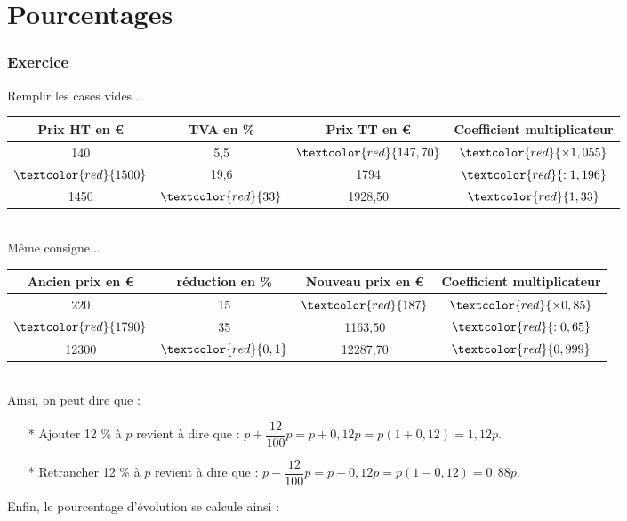 \setcounter{section}{0} 

\part{Pourcentages}

\section{Exercice }

Remplir les cases vides... \\

\begin{tabular}{c|c|c|c} 
Prix HT en € & TVA en \% & Prix TT en € & Coefficient multiplicateur \\
\hline
140 & 5,5 & $\textcolor{red}{147,70}$ & $\textcolor{red}{\times 1,055}$ \\
$\textcolor{red}{1500}$& 19,6 & 1794 & $\textcolor{red}{: 1,196}$ \\
1450 & $\textcolor{red}{33}$ & 1928,50 & $\textcolor{red}{1,33}$ \\
\end{tabular} \\

Même consigne... \\

\begin{tabular}{c|c|c|c} 
Ancien prix en € & réduction en \% & Nouveau prix en € & Coefficient multiplicateur \\
\hline
220 & 15 & $\textcolor{red}{187}$ & $\textcolor{red}{\times 0,85}$ \\
$\textcolor{red}{1790}$& 35 & 1163,50 & $\textcolor{red}{: 0,65}$ \\
12300 & $\textcolor{red}{0,1}$ & 12287,70 & $\textcolor{red}{0,999}$ \\
\end{tabular} \\

Ainsi, on peut dire que : 

\begin{enumerate}
\item[*] Ajouter 12 \% à $p$ revient à dire que : $ p + \dfrac{12}{100}p = p + 0,12p = p \left(1 + 0,12\right) = 1,12 p$.
\item[*] Retrancher 12 \% à $p$ revient à dire que : $ p - \dfrac{12}{100}p = p - 0,12p = p \left(1 - 0,12\right) = 0,88 p$.
\end{enumerate}

Enfin, le pourcentage d'évolution se calcule ainsi : \\

